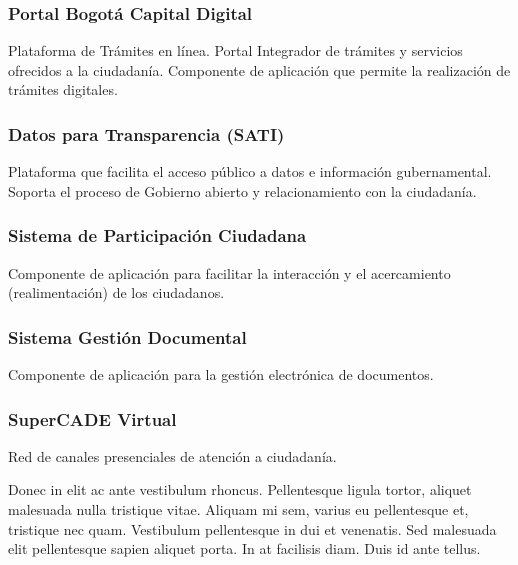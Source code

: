 \documentclass[
	a4paper, %
	12pt, %
]{include/CSSullivanBusinessReport}
\begin{document}
\subsubsection{Portal Bogotá Capital
Digital}\label{sec:portal-bogotuxe1-capital-digital-1}

Plataforma de Trámites en línea. Portal Integrador de trámites y
servicios ofrecidos a la ciudadanía. Componente de aplicación que
permite la realización de trámites digitales.

\subsubsection{Datos para Transparencia
(SATI)}\label{sec:datos-para-transparencia-sati-1}

Plataforma que facilita el acceso público a datos e información
gubernamental. Soporta el proceso de Gobierno abierto y relacionamiento
con la ciudadanía.

\subsubsection{Sistema de Participación
Ciudadana}\label{sec:sistema-de-participaciuxf3n-ciudadana}

Componente de aplicación para facilitar la interacción y el acercamiento
(realimentación) de los ciudadanos.

\subsubsection{Sistema Gestión
Documental}\label{sec:sistema-gestiuxf3n-documental}

Componente de aplicación para la gestión electrónica de documentos.

\subsubsection{SuperCADE Virtual}\label{sec:supercade-virtual}

Red de canales presenciales de atención a
ciudadanía.

Donec in elit ac ante vestibulum rhoncus. Pellentesque ligula tortor, aliquet malesuada nulla tristique vitae. Aliquam mi sem, varius eu pellentesque et, tristique nec quam. Vestibulum pellentesque in dui et venenatis. Sed malesuada elit pellentesque sapien aliquet porta. In at facilisis diam. Duis id ante tellus. %
\end{document}
